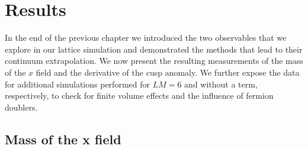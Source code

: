 \chapter{Results}
In the end of the previous chapter we introduced the two observables that we explore in our lattice simulation and demonstrated the methods that lead to their continuum extrapolation. We now present the resulting measurements of the mass of the $x$ field and the derivative of the cusp anomaly. We further expose the data for additional simulations performed for $LM=6$ and without a  term, respectively, to check for finite volume effects and the influence of fermion doublers.
%
%
%
%
%
%
\section[Mass of the x field]{Mass of the x field}
%
%
%
%
